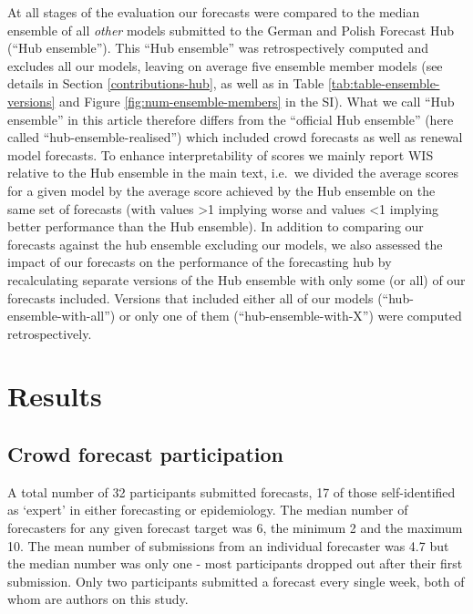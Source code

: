 \documentclass[10pt,letterpaper]{article}
\begin{document}
At all stages of the evaluation our forecasts were compared to the
median ensemble of all \emph{other} models submitted to the German and
Polish Forecast Hub (``Hub ensemble''). This ``Hub ensemble'' was
retrospectively computed and excludes all our models, leaving on average
five ensemble member models (see details in Section
\ref{contributions-hub}, as well as in Table
\ref{tab:table-ensemble-versions} and Figure
\ref{fig:num-ensemble-members} in the SI). What we call ``Hub ensemble''
in this article therefore differs from the ``official Hub ensemble''
(here called ``hub-ensemble-realised'') which included crowd forecasts
as well as renewal model forecasts. To enhance interpretability of
scores we mainly report WIS relative to the Hub ensemble in the main
text, i.e.~we divided the average scores for a given model by the
average score achieved by the Hub ensemble on the same set of forecasts
(with values \textgreater1 implying worse and values \textless1 implying
better performance than the Hub ensemble). In addition to comparing our
forecasts against the hub ensemble excluding our models, we also
assessed the impact of our forecasts on the performance of the
forecasting hub by recalculating separate versions of the Hub ensemble
with only some (or all) of our forecasts included. Versions that
included either all of our models (``hub-ensemble-with-all'') or only
one of them (``hub-ensemble-with-X'') were computed retrospectively.

\hypertarget{results}{%
\section{Results}\label{results}}

\hypertarget{crowd-forecast-participation}{%
\subsection{Crowd forecast
participation}\label{crowd-forecast-participation}}

A total number of 32 participants submitted forecasts, 17 of those
self-identified as `expert' in either forecasting or epidemiology. The
median number of forecasters for any given forecast target was 6, the
minimum 2 and the maximum 10. The mean number of submissions from an
individual forecaster was 4.7 but the median number was only one - most
participants dropped out after their first submission. Only two
participants submitted a forecast every single week, both of whom are
authors on this study.
\end{document}
